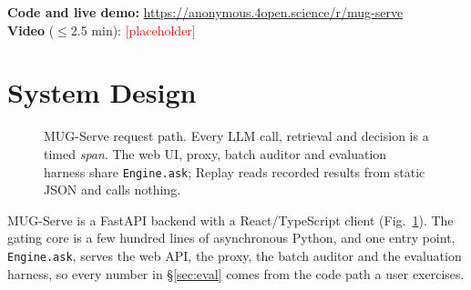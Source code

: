 \documentclass[11pt]{article}
\begin{document}
\smallskip\noindent
\textbf{Code and live demo:} \url{https://anonymous.4open.science/r/mug-serve}\\
\textbf{Video} ($\le$2.5 min): \textcolor{red}{[placeholder]}

\section{System Design}
\label{sec:system}
\begin{figure}[t]
\centering
{}
\caption{MUG-Serve request path. Every LLM call, retrieval and decision is a
timed \emph{span}. The web UI, proxy, batch auditor and evaluation harness share
\texttt{Engine.ask}; Replay reads recorded results from static JSON and calls
nothing.}
\label{fig:arch}
\end{figure}

MUG-Serve is a FastAPI backend with a React/TypeScript client
(Fig.~\ref{fig:arch}). The gating core is a few hundred lines of asynchronous
Python, and one entry point, \texttt{Engine.ask}, serves the web API, the proxy,
the batch auditor and the evaluation harness, so every number in
\S\ref{sec:eval} comes from the code path a user exercises.
\end{document}
